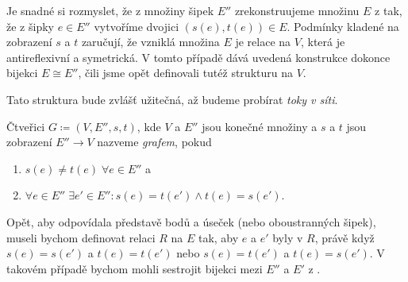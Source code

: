 Je snadné si rozmyslet, že z množiny šipek $E''$ zrekonstruujeme množinu $E$ z
 tak, že z šipky $e \in E''$ vytvoříme dvojici
$(s(e),t(e)) \in E$. Podmínky kladené na zobrazení $s$ a $t$ zaručují, že
vzniklá množina $E$ je relace na $V$, která je antireflexivní a symetrická. V
tomto případě dává uvedená konstrukce dokonce bijekci $E \cong E''$, čili jsme
opět definovali tutéž strukturu na $V$.

Tato struktura bude zvlášť užitečná, až budeme probírat \emph{toky v síti}.

\begin{definition}
\label{def:graf-potreti}
 Čtveřici $G \coloneqq (V,E'',s,t)$, kde $V$ a $E''$ jsou konečné množiny a $s$ 
 a $t$ jsou zobrazení $E'' \to V$ nazveme \emph{grafem}, pokud
 \begin{enumerate}[label=(\alph*)]
  \item $s(e) \neq t(e) \; \forall e \in E''$ a
  \item $\forall e \in E'' \; \exists e' \in E'': s(e) = t(e') \wedge t(e) =
   s(e')$.
 \end{enumerate}
\end{definition}

\begin{remark}
 Opět, aby  odpovídala představě bodů a
 úseček (nebo oboustranných šipek), museli bychom definovat relaci $R$ na $E$
 tak, aby $e$ a $e'$ byly v $R$, právě když $s(e) = s(e')$ a $t(e) = t(e')$ nebo
 $s(e) = t(e')$ a $t(e) = s(e')$. V takovém případě bychom mohli sestrojit
 bijekci mezi $E''$ a $E'$ z .
\end{remark}

